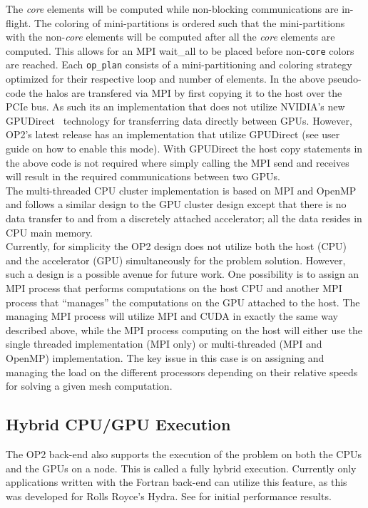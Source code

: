 \documentclass[11pt]{article}
\begin{document}
The \textit{core} elements will be computed while non-blocking communications are in-flight. The coloring of
mini-partitions is ordered such that the mini-partitions with the non-\textit{core} elements will be computed after all
the \textit{core} elements are computed. This allows for an MPI wait\_all to be placed before non-\texttt{core} colors
are reached. Each \texttt{op\_plan} consists of a mini-partitioning and coloring strategy optimized for their respective
loop and number of elements. In the above pseudo-code the halos are transfered via MPI by first copying it to the host
over the PCIe bus. As such its an implementation that does not utilize NVIDIA's new GPUDirect~\cite{gpudirect}
technology for transferring data directly between GPUs. However, OP2's latest release has an implementation that utilize
GPUDirect (see user guide on how to enable this mode). With GPUDirect the host copy statements in the above code is not
required where simply calling the MPI send and receives will result in the required communications between two GPUs.\\

\noindent The multi-threaded CPU cluster implementation is based on MPI and OpenMP and follows a similar design to the
GPU cluster design except that there is no data transfer to and from a discretely attached accelerator; all the data
resides in CPU main memory.\\

\noindent Currently, for simplicity the OP2 design does not utilize both the host (CPU) and the accelerator (GPU)
simultaneously for the problem solution. However, such a design is a possible avenue for future work. One possibility is
to assign an MPI process that performs computations on the host CPU and another MPI process that ``manages'' the
computations on the GPU attached to the host. The managing MPI process will utilize MPI and CUDA in exactly the same way
described above, while the MPI process computing on the host will either use the single threaded implementation (MPI
only) or multi-threaded (MPI and OpenMP) implementation. The key issue in this case is on assigning and managing the
load on the different processors depending on their relative speeds for solving a given mesh computation.

\subsection{Hybrid CPU/GPU Execution}\label{sec/hybrid}

The OP2 back-end also supports the execution of the problem on both the CPUs and the GPUs on a node. This is called a
fully hybrid execution. Currently only applications written with the Fortran back-end can utilize this feature, as this
was developed for Rolls Royce's Hydra. See \cite{hydra-paper} for initial performance results.
\end{document}
